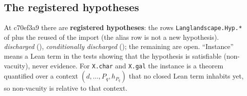 \subsection{The registered hypotheses}
At c70ef3a9 there are \textbf{\NumHypRegistered{} registered hypotheses}: the \NumHypRows{} rows \texttt{Langlandscape.Hyp.*} of
 plus the reused  of the import (the alias row
 is not a new hypothesis). \NumHypDischarged{} \emph{discharged} (\HypDischargedNames), \NumHypCondDischarged{}
\emph{conditionally discharged} (\HypCondDischargedNames); the remaining \NumHypOpen{} are open.
``Instance'' means a Lean term in the tests showing that the hypothesis is satisfiable (non-vacuity), never evidence.
For \texttt{X.char} and \texttt{X.gal} the instance is a theorem quantified over a context $(d,\dots,P_q,h_{P_q})$ that no
closed Lean term inhabits yet, so non-vacuity is relative to that context.
\begingroup\small\setlength{\tabcolsep}{4pt}
